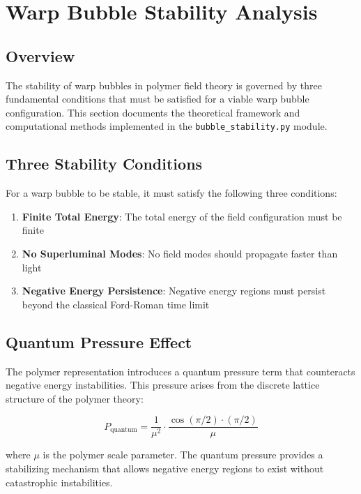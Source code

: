\section{Warp Bubble Stability Analysis}

\subsection{Overview}

The stability of warp bubbles in polymer field theory is governed by three fundamental conditions that must be satisfied for a viable warp bubble configuration. This section documents the theoretical framework and computational methods implemented in the \texttt{bubble\_stability.py} module.

\subsection{Three Stability Conditions}

For a warp bubble to be stable, it must satisfy the following three conditions:

\begin{enumerate}
\item \textbf{Finite Total Energy}: The total energy of the field configuration must be finite
\item \textbf{No Superluminal Modes}: No field modes should propagate faster than light
\item \textbf{Negative Energy Persistence}: Negative energy regions must persist beyond the classical Ford-Roman time limit
\end{enumerate}

\subsection{Quantum Pressure Effect}

The polymer representation introduces a quantum pressure term that counteracts negative energy instabilities. This pressure arises from the discrete lattice structure of the polymer theory:

\begin{equation}
P_{\text{quantum}} = \frac{1}{\mu^2} \cdot \frac{\cos(\pi/2) \cdot (\pi/2)}{\mu}
\end{equation}

where $\mu$ is the polymer scale parameter. The quantum pressure provides a stabilizing mechanism that allows negative energy regions to exist without catastrophic instabilities.


